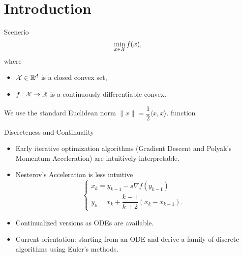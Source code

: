 \section{Introduction}

\begin{frame}{Scenerio}
  \begin{equation}
    \min\limits_{x\in \mathcal{X}} f(x),
  \end{equation}
  where
  \begin{itemize}
    \item $\mathcal{X}\in\mathbb{R}^d$ is a closed convex set,
    \item $f:\mathcal{X}\to\mathbb{R}$ is a continuously differentiable convex.
  \end{itemize}
  We use the standard Euclidean norm $\|x\|= \dfrac{1}{2}\langle x,x\rangle$.
  function
\end{frame}

\begin{frame}{Discreteness and Continuality}
  \begin{itemize}
    \item Early iterative optimization algorithms (Gradient Descent and Polyak's Momentum Acceleration) are intuitively interpretable.
    \item Nesterov's Acceleration is less intuitive
          \begin{equation}
            \begin{cases}
              x_k = y_{k-1} - s\nabla f(y_{k-1}) \\
              y_k = x_k + \dfrac{k-1}{k+2}(x_k - x_{k-1}).
            \end{cases}
          \end{equation}
    \item Continualized versions as ODEs are available.
    \item Current orientation: starting from an ODE and derive a family of discrete algorithms using Euler's methods.
  \end{itemize}
\end{frame}

